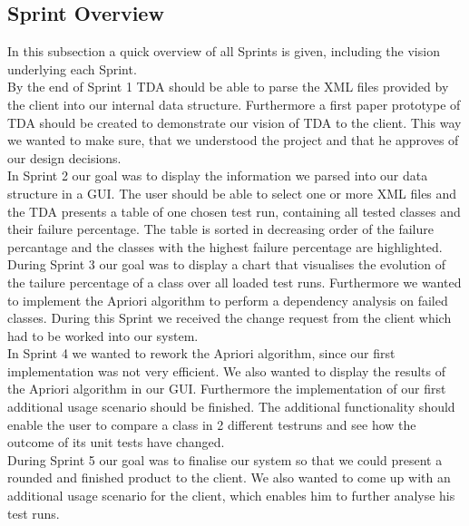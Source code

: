 
\subsection{Sprint Overview}

In this subsection a quick overview of all Sprints is given, including the vision underlying each Sprint. \\
By the end of Sprint 1 TDA should be able to parse the XML files provided by the client into our internal data structure. Furthermore a first paper prototype of TDA should be created to demonstrate our vision of TDA to the client. This way we wanted to make sure, that we understood the project and that he approves of our design decisions. \\ 
In Sprint 2 our goal was to display the information we parsed into our data structure in a GUI. The user should be able to select one or more XML files and the TDA presents a table of one chosen test run, containing all tested classes and their failure percentage. The table is sorted in decreasing order of the failure percantage and the classes with the highest failure percentage are highlighted. \\ 
During Sprint 3 our goal was to display a chart that visualises the evolution of the tailure percentage of a class over all loaded test runs. Furthermore we wanted to implement the Apriori algorithm to perform a dependency analysis on failed classes. During this Sprint we received the change request from the client which had to be worked into our system. \\ 
In Sprint 4 we wanted to rework the Apriori algorithm, since our first implementation was not very efficient. We also wanted to display the results of the Apriori algorithm in our GUI. Furthermore the implementation of our first additional usage scenario should be finished. The additional functionality should enable the user to compare a class in 2 different testruns and see how the outcome of its unit tests have changed. \\ 
During Sprint 5 our goal was to finalise our system so that we could present a rounded and finished product to the client. We also wanted to come up with an additional usage scenario for the client, which enables him to further analyse his test runs. \\ 
